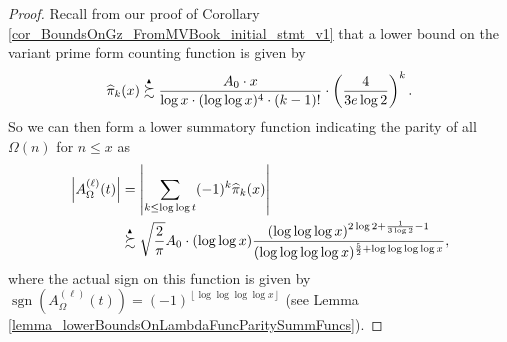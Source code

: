 \documentclass[11pt,reqno,a4letter]{article}
\numberwithin{figure}{section}
\numberwithin{table}{section}
\newcommand{\floor}[1]{\left\lfloor #1 \right\rfloor}
\theoremstyle{plain}
\numberwithin{theorem}{section}
\theoremstyle{definition}
\newcommand{\SuccSim}[0]{\overset{_{\scriptsize{\blacktriangle}}}{\succsim}}
\begin{document}
\begin{proof} 
Recall from our proof of Corollary \ref{cor_BoundsOnGz_FromMVBook_initial_stmt_v1} that 
a lower bound on the variant prime form counting function is given by 
\[
\widehat{\pi}_k(x) \SuccSim \frac{A_0 \cdot x}{\log x \cdot (\log\log x)^4 \cdot (k-1)!} \cdot 
     \left(\frac{4}{3e\log 2}\right)^{k}. 
\]
So we can then form a lower summatory function indicating the parity of all 
$\Omega(n)$ for $n \leq x$ as 
\begin{align} 
\label{proof_thm_GInvFunc_v0} 
\left\lvert A_{\Omega}^{(\ell)}(t) \right\rvert & = 
     \left\lvert \sum_{k \leq \log\log t} (-1)^k \widehat{\pi}_k(x) \right\rvert \\ 
\notag
     & \SuccSim  
     \sqrt{\frac{2}{\pi}} A_0 \cdot (\log\log x) 
     \frac{(\log\log\log x)^{2\log 2+ \frac{1}{3 \log 2} - 1}}{ 
     (\log\log\log\log x)^{\frac{5}{2} + \log\log\log\log x}}, 
\end{align} 
where the actual sign on this function is given by 
$\operatorname{sgn}(A_{\Omega}^{(\ell)}(t)) = (-1)^{\floor{\log\log\log\log x}}$ 
(see Lemma \ref{lemma_lowerBoundsOnLambdaFuncParitySummFuncs}). 


\end{proof}
\end{document}
